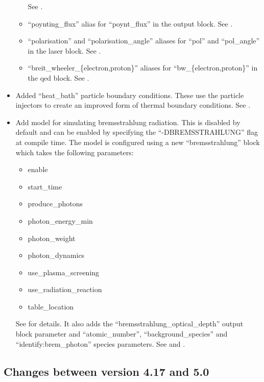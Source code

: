 \begin{itemize}
\begin{itemize}
    See .
\item ``poynting\_flux'' alias for ``poynt\_flux'' in the output block.
    See .
\item ``polarisation'' and ``polarisation\_angle'' aliases for ``pol'' and
    ``pol\_angle'' in the laser block.  See .
\item ``breit\_wheeler\_\{electron,proton\}'' aliases for
    ``bw\_\{electron,proton\}'' in the qed block. See .
\end{itemize}
\item Added ``heat\_bath'' particle boundary conditions. These use the particle
    injectors to create an improved form of thermal boundary conditions.
    See .
\item Add model for simulating bremsstrahlung radiation. This is disabled by
   default and can be enabled by specifying the ``-DBREMSSTRAHLUNG'' flag at
   compile time. The model is configured using a new ``bremsstrahlung'' block
   which takes the following parameters:
\begin{itemize}
\item enable
\item start\_time
\item produce\_photons
\item photon\_energy\_min
\item photon\_weight
\item photon\_dynamics
\item use\_plasma\_screening
\item use\_radiation\_reaction
\item table\_location
\end{itemize}
   See  for details.
   It also adds the ``bremsstrahlung\_optical\_depth'' output block parameter
   and ``atomic\_number'', ``background\_species'' and
   ``identify:brem\_photon'' species parameters. See
    and .
\end{itemize}
\bigskip


\subsection{Changes between version 4.17 and 5.0}

